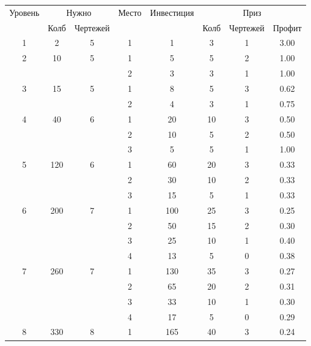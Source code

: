 \begin{longtable}[c]{|c|c|c|c|c|c|c|c|}
    \hline
    \multirow{ 2}{*}{\small Уровень} &
    \multicolumn{2}{|c|}{\small Нужно} &
    \multirow{ 2}{*}{\small Место} & 
    \multirow{ 2}{*}{\small Инвестиция} & 
    \multicolumn{3}{|c|}{\small Приз} \\\cline{2-3}\cline{6-8}
    &
    {\small Колб} & 
    {\small Чертежей} & 
    & &
    {\small Колб} & 
    {\small Чертежей} & 
    {\small Профит}
    \\\hline\endhead
    \multirow{1}{*}{1} & \multirow{1}{*}{2} & \multirow{1}{*}{5} & 1 & 1 & 3 & 1 & 3.00 \\\hline
    \multirow{2}{*}{2} & \multirow{2}{*}{10} & \multirow{2}{*}{5} & 1 & 5 & 5 & 2 & 1.00 \\\cline{4-8}
    & & & 2 & 3 & 3 & 1 & 1.00 \\\hline
    \multirow{2}{*}{3} & \multirow{2}{*}{15} & \multirow{2}{*}{5} & 1 & 8 & 5 & 3 & 0.62 \\\cline{4-8}
    & & & 2 & 4 & 3 & 1 & 0.75 \\\hline
    \multirow{3}{*}{4} & \multirow{3}{*}{40} & \multirow{3}{*}{6} & 1 & 20 & 10 & 3 & 0.50 \\\cline{4-8}
    & & & 2 & 10 & 5 & 2 & 0.50 \\\cline{4-8}
    & & & 3 & 5 & 5 & 1 & 1.00 \\\hline
    \multirow{3}{*}{5} & \multirow{3}{*}{120} & \multirow{3}{*}{6} & 1 & 60 & 20 & 3 & 0.33 \\\cline{4-8}
    & & & 2 & 30 & 10 & 2 & 0.33 \\\cline{4-8}
    & & & 3 & 15 & 5 & 1 & 0.33 \\\hline
    \multirow{4}{*}{6} & \multirow{4}{*}{200} & \multirow{4}{*}{7} & 1 & 100 & 25 & 3 & 0.25 \\\cline{4-8}
    & & & 2 & 50 & 15 & 2 & 0.30 \\\cline{4-8}
    & & & 3 & 25 & 10 & 1 & 0.40 \\\cline{4-8}
    & & & 4 & 13 & 5 & 0 & 0.38 \\\hline
    \multirow{4}{*}{7} & \multirow{4}{*}{260} & \multirow{4}{*}{7} & 1 & 130 & 35 & 3 & 0.27 \\\cline{4-8}
    & & & 2 & 65 & 20 & 2 & 0.31 \\\cline{4-8}
    & & & 3 & 33 & 10 & 1 & 0.30 \\\cline{4-8}
    & & & 4 & 17 & 5 & 0 & 0.29 \\\hline
    \multirow{4}{*}{8} & \multirow{4}{*}{330} & \multirow{4}{*}{8} & 1 & 165 & 40 & 3 & 0.24 \\\cline{4-8}

\end{longtable}
